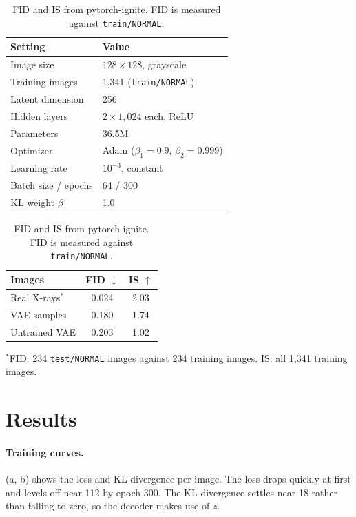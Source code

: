 \documentclass{article}
\newcommand{\vaeFID}{0.180}
\newcommand{\vaeIS}{1.74}
\begin{document}
\begin{table}[t]
\centering
\small
\begin{minipage}[t]{0.56\linewidth}
\centering
\caption{Hyperparameter settings.}
\label{tab:hyper}
\begin{tabular}{@{}ll@{}}
\toprule
Setting & Value \\
\midrule
Image size & $128\times128$, grayscale \\
Training images & 1{,}341 (\texttt{train/NORMAL}) \\
Latent dimension & 256 \\
Hidden layers & $2\times1{,}024$ each, ReLU \\
Parameters & 36.5M \\
Optimizer & Adam ($\beta_1=0.9$, $\beta_2=0.999$) \\
Learning rate & $10^{-3}$, constant \\
Batch size / epochs & 64 / 300 \\
KL weight $\beta$ & 1.0 \\
\bottomrule
\end{tabular}
\end{minipage}\hfill
\begin{minipage}[t]{0.42\linewidth}
\centering
\caption{FID and IS from pytorch-ignite. FID is measured against \texttt{train/NORMAL}.}
\label{tab:scores}
\begin{tabular}{@{}lcc@{}}
\toprule
Images & FID $\downarrow$ & IS $\uparrow$ \\
\midrule
Real X-rays$^*$ & 0.024 & 2.03 \\
VAE samples & \vaeFID & \vaeIS \\
Untrained VAE & 0.203 & 1.02 \\
\bottomrule
\end{tabular}

\vspace{2pt}
\parbox{\linewidth}{\scriptsize $^*$FID: 234 \texttt{test/NORMAL} images against 234 training images. IS: all 1{,}341 training images.}
\end{minipage}
\end{table}

\section{Results}

\paragraph{Training curves.} (a, b) shows the loss and KL divergence per image. The loss drops quickly at first and levels off near 112 by epoch 300. The KL divergence settles near 18 rather than falling to zero, so the decoder makes use of $z$.
\end{document}
